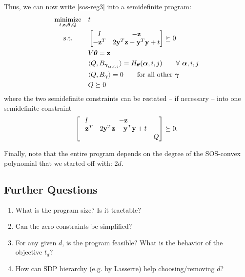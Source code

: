 \documentclass[11pt]{article}
\begin{document}
Thus, we can now write \eqref{sos-reg3} into a semidefinite program:
\begin{equation}\label{sos-reg4}
\begin{aligned}
& \underset{t, {\bf z}, {\boldsymbol\theta}, Q}{\text{minimize}}
& & t \\
& \text{\quad\ s.t.}
& & \begin{bmatrix} I & -{\bf z} \\ -{\bf z}^T & 2{\bf y}^T{\bf z} - {\bf y}^T{\bf y} + t \end{bmatrix} \succeq 0 \\
& & & V{\boldsymbol\theta} = {\bf z} \\
& & & \langle{Q, B_{{\boldsymbol\gamma}_{{\boldsymbol\alpha}, i, j}}\rangle} = H_{\boldsymbol\theta}({\boldsymbol\alpha}, i, j) \qquad \forall\ {\boldsymbol\alpha}, i, j \\
& & & \langle{Q, B_{{\boldsymbol\gamma}}\rangle} = 0 \qquad \text{for all other ${\boldsymbol\gamma}$} \\
& & & Q \succeq 0 
\end{aligned}
\end{equation}
where the two semidefinite constraints can be restated -- if necessary -- into one semidefinite constraint
\[
\begin{bmatrix} I & -{\bf z} &  \\ -{\bf z}^T & 2{\bf y}^T{\bf z} - {\bf y}^T{\bf y} + t & \\ & & Q \end{bmatrix} \succeq 0.
\]

Finally, note that the entire program depends on the degree of the SOS-convex polynomial that we started off with: $2d$. 

\subsection*{Further Questions}

\begin{enumerate}
\item What is the program size? Is it tractable?
\item Can the zero constraints be simplified?
\item For any given $d$, is the program feasible? What is the behavior of the objective $t_d$?
\item How can SDP hierarchy (e.g. by Lasserre) help choosing/removing $d$?
\end{enumerate}


%
%
\end{document}
